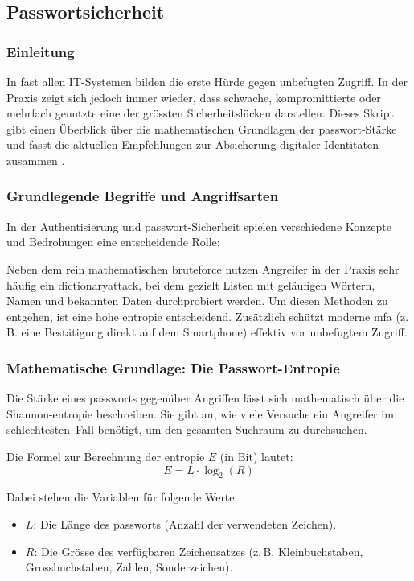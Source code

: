 \documentclass[12pt,a4paper]{article}
\begin{document}
\subsection{Passwortsicherheit}
\label{sec:passwortsicherheit}

\subsubsection{Einleitung}
In fast allen IT-Systemen bilden  die erste Hürde gegen unbefugten Zugriff. In der Praxis zeigt sich jedoch immer wieder, dass schwache, kompromittierte oder mehrfach genutzte  eine der grössten Sicherheitslücken darstellen. Dieses Skript gibt einen Überblick über die mathematischen Grundlagen der \gls{passwort}-Stärke und fasst die aktuellen Empfehlungen zur Absicherung digitaler Identitäten zusammen \cite{nist2024}.

\subsubsection{Grundlegende Begriffe und Angriffsarten}
In der Authentisierung und \gls{passwort}-Sicherheit spielen verschiedene Konzepte und \mbox{Bedrohungen} eine entscheidende Rolle:

Neben dem rein mathematischen \gls{bruteforce} nutzen Angreifer in der Praxis sehr häufig ein \gls{dictionaryattack}, bei dem gezielt Listen mit geläufigen Wörtern, Namen und bekannten Daten \mbox{durchprobiert} werden. Um diesen \mbox{Methoden} zu entgehen, ist eine hohe \gls{entropie} entscheidend. Zusätzlich schützt moderne \mbox{\gls{mfa}} (z.\,B. eine Bestätigung direkt auf dem Smartphone) effektiv vor unbefugtem Zugriff.

\subsubsection{Mathematische Grundlage: Die Passwort-Entropie}
\label{subsec:entropie}
Die Stärke eines \gls{passwort}s gegenüber Angriffen lässt sich mathematisch über die Shannon-\gls{entropie} beschreiben. Sie gibt an, wie viele Versuche ein Angreifer im \mbox{schlechtesten Fall} benötigt, um den gesamten Suchraum zu durchsuchen.

Die Formel zur Berechnung der \gls{entropie} $E$ (in Bit) lautet:
\[
E = L \cdot \log_2(R)
\]

Dabei stehen die Variablen für folgende Werte:
\begin{itemize}
    \item $L$: Die Länge des \gls{passwort}s (Anzahl der verwendeten Zeichen).
    \item $R$: Die Grösse des verfügbaren Zeichensatzes (z.\,B. Kleinbuchstaben, Grossbuchstaben, Zahlen, Sonderzeichen).
\end{itemize}
\newpage
\end{document}
